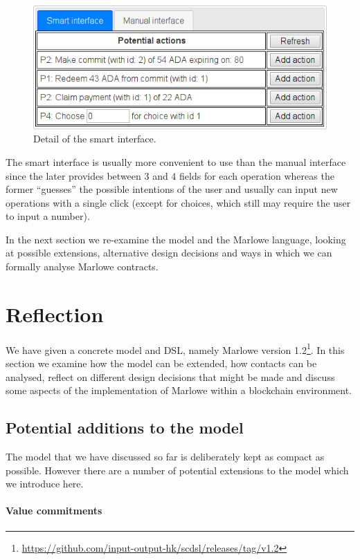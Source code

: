 \documentclass[
      acmsmall
    , screen
  ]{acmart}
\begin{document}
\begin{figure}
\centering{}\includegraphics[scale=0.5]{pix/detail4}\caption{\label{fig:detail-of-smart-interface}Detail of the smart 
interface.}
\end{figure}

The smart interface is usually more convenient to use than the manual
interface since the later provides between 3 and 4 fields for each
operation whereas the former ``guesses'' the possible intentions
of the user and usually can input new operations with a single click
(except for choices, which still may require the user to input a number).

In the next section we re-examine the model and the Marlowe language, looking at possible extensions, alternative design decisions and ways in which we can formally analyse Marlowe contracts.

\section{Reflection}
\label{section:reflection}

We have given a concrete model and DSL, namely Marlowe version 
1.2\footnote{\url{https://github.com/input-output-hk/scdsl/releases/tag/v1.2}}.
In this section we examine how the model can be extended, how contacts can be analysed, reflect on different design 
decisions that might be made and discuss some aspects of the implementation of Marlowe within a blockchain environment.

\subsection{Potential additions to the model}

The model that we have discussed so far is deliberately kept as compact as possible. However there are a number of potential extensions to the model which we introduce here. 

\paragraph{Value commitments}
\end{document}
